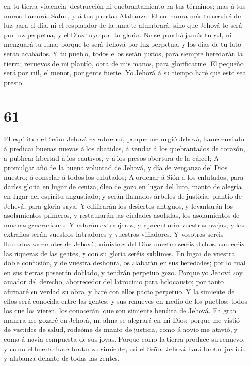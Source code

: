 en tu tierra violencia, destrucción ni quebrantamiento en tus términos;
mas á tus muros llamarás Salud, y á tus puertas Alabanza. 
El sol nunca más te servirá de luz para el día, ni el resplandor de la
luna te alumbrará; sino que Jehová te será por luz perpetua, y el Dios
tuyo por tu gloria.  No se pondrá jamás tu sol, ni menguará
tu luna: porque te será Jehová por luz perpetua, y los días de tu luto
serán acabados.  Y tu pueblo, todos ellos serán justos,
para siempre heredarán la tierra; renuevos de mi plantío, obra de mis
manos, para glorificarme.  El pequeño será por mil, el
menor, por gente fuerte. Yo Jehová á su tiempo haré que esto sea presto.

\hypertarget{section-60}{%
\section{61}\label{section-60}}

 El espíritu del Señor Jehová es sobre mí, porque me ungió
Jehová; hame enviado á predicar buenas nuevas á los abatidos, á vendar á
los quebrantados de corazón, á publicar libertad á los cautivos, y á los
presos abertura de la cárcel;  A promulgar año de la buena
voluntad de Jehová, y día de venganza del Dios nuestro; á consolar á
todos los enlutados;  A ordenar á Sión á los enlutados, para
darles gloria en lugar de ceniza, óleo de gozo en lugar del luto, manto
de alegría en lugar del espíritu angustiado; y serán llamados árboles de
justicia, plantío de Jehová, para gloria suya.  Y edificarán
los desiertos antiguos, y levantarán los asolamientos primeros, y
restaurarán las ciudades asoladas, los asolamientos de muchas
generaciones.  Y estarán extranjeros, y apacentarán vuestras
ovejas, y los extraños serán vuestros labradores y vuestros viñadores.
 Y vosotros seréis llamados sacerdotes de Jehová, ministros
del Dios nuestro seréis dichos: comeréis las riquezas de las gentes, y
con su gloria seréis sublimes.  En lugar de vuestra doble
confusión, y de vuestra deshonra, os alabarán en sus heredades; por lo
cual en sus tierras poseerán doblado, y tendrán perpetuo gozo.
 Porque yo Jehová soy amador del derecho, aborrecedor del
latrocinio para holocausto; por tanto afirmaré en verdad su obra, y haré
con ellos pacto perpetuo.  Y la simiente de ellos será
conocida entre las gentes, y sus renuevos en medio de los pueblos; todos
los que los vieren, los conocerán, que son simiente bendita de Jehová.
 En gran manera me gozaré en Jehová, mi alma se alegrará en
mi Dios; porque me vistió de vestidos de salud, rodeóme de manto de
justicia, como á novio me atavió, y como á novia compuesta de sus joyas.
 Porque como la tierra produce su renuevo, y como el huerto
hace brotar su simiente, así el Señor Jehová hará brotar justicia y
alabanza delante de todas las gentes.

